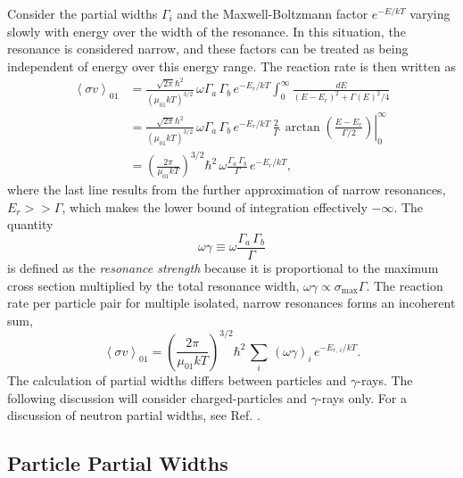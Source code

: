Consider the partial widths $\Gamma_{i}$ and the Maxwell-Boltzmann factor $e^{-E/kT}$ varying slowly with energy over the width of the resonance. In this situation, the resonance is considered narrow, and these factors can be treated as being independent of energy over this energy range. The reaction rate is then written as
\begin{align}
\left\langle \sigma v \right\rangle_{01} &= \frac{\sqrt{2 \pi} \hbar^{2}}{\left(\mu_{01} k T\right)^{3/2}} \, \omega \Gamma_{a} \, \Gamma_{b} \, e^{-E_{r}/kT} \int_{0}^{\infty} \frac{dE}{\left(E - E_{r}\right)^{2} + \Gamma(E)^{2}/4} \nonumber \\
&= \frac{\sqrt{2 \pi} \hbar^{2}}{\left(\mu_{01} k T\right)^{3/2}} \, \omega \Gamma_{a} \, \Gamma_{b} \, e^{-E_{r}/kT} \, \frac{2}{\Gamma} \, \left. \arctan\left( \frac{E - E_{r}}{\Gamma/2} \right)\right|_{0}^{\infty} \nonumber \\
&= \left(\frac{2 \pi}{\mu_{01} k T}\right)^{3/2} \hbar^{2} \, \omega \frac{\Gamma_{a} \, \Gamma_{b}}{\Gamma} \, e^{-E_{r}/kT},
\end{align}
where the last line results from the further approximation of narrow resonances, $E_{r} >> \Gamma$, which makes the lower bound of integration effectively $-\infty$. The quantity
\begin{equation}
\omega \gamma \equiv \omega \frac{\Gamma_{a} \, \Gamma_{b}}{\Gamma}
\end{equation}
is defined as the \emph{resonance strength} because it is proportional to the maximum cross section multiplied by the total resonance width, $\omega \gamma \propto \sigma_{\mathrm{max}} \Gamma$. The reaction rate per particle pair for multiple isolated, narrow resonances forms an incoherent sum,
\begin{equation} \label{eqn:narrow_rate}
\left\langle \sigma v \right\rangle_{01} = \left(\frac{2 \pi}{\mu_{01} k T}\right)^{3/2} \hbar^{2} \, \sum_{i} \, (\omega \gamma)_{i} \, e^{-E_{r, \, i}/kT}.
\end{equation}
The calculation of partial widths differs between particles and $\gamma$-rays. The following discussion will consider charged-particles and $\gamma$-rays only. For a discussion of neutron partial widths, see Ref. \cite{Iliadis2015}.

\subsection{Particle Partial Widths} \label{subsec:particle_partial_widths}

